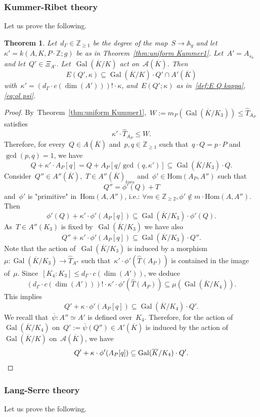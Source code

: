 \documentclass[12pt]{amsart}
\newtheorem{theorem}{Theorem}[section]
\newcommand{\Hom}{\mbox{Hom}}
\newcommand{\Gal}{{\rm Gal}}
\newcommand{\Z}{{\mathbb Z}}
\renewcommand{\Gal}{{\operatorname{Gal}}}
\newcommand{\ol}{\overline}
\newcommand{\wh}{\widehat}
\begin{document}
\subsubsection{Kummer-Ribet theory}
Let us prove the following.
\begin{theorem}\label{thm:Gal En} Let~$d_\Gamma\in\Z_{\geq1}$ be the degree of the map~$S\to \mathbb{A}_g$ and let~$\kappa'=k(A,K,P\cdot \Z;g)$ be as in Theorem~\ref{thm:uniform Kummer1}.
Let~$A'=A_{s_n}$ and let~$Q'\in\Xi_{A'}$. Let~$\Gal(\ol{K}/K)$ act on~$\mathcal{A}(\ol{K})$.
Then
\[
E(Q',\kappa)\subseteq \Gal(\ol{K}/K) \cdot Q'\cap A'(\ol{K})
\]
with~$\kappa'=(d_\Gamma\cdot c(\dim(A')))!\cdot \kappa$, and~$E(Q';\kappa)$ as in~\eqref{def:E Q kappa}, \eqref{eq:ol psi}.
\end{theorem}
\begin{proof}
By~Theorem~\ref{thm:uniform Kummer1},~$W:=m_P(\Gal(\ol{K}/K_3))\leq \wh{T}_{A_P}$ satisfies
\[
\kappa'\cdot\wh{T}_{A_P}\leq  W.
\]
Therefore, for every~$Q\in A(\ol{K})$ and~$p,q\in\Z_{\geq1}$ such that~$q\cdot Q=p\cdot P$ and~$\gcd(p,q)=1$, we have
\[
Q+\kappa'\cdot A_P[q]=Q+A_P[q/\gcd(q,\kappa')]\subseteq \Gal(\ol{K}/K_3)\cdot Q.
\]
Consider~$Q''\in A''(\ol{K})$,~$T\in A''(\ol{K})_{tors}$ and~$\phi'\in \Hom(A_P,A'')$ such that
\[
Q''=\phi'(Q)+T
\]
and~$\phi'$ is "primitive" in~$\Hom(A,A'')$, i.e.:
$
\forall m\in\Z_{\geq2}, \phi'\not\in m\cdot \Hom(A,A'').
$
Then
\[
\phi'(Q)+\kappa'\cdot \phi'(A_P[q])\subseteq \Gal(\ol{K}/K_3)\cdot \phi'(Q).
\]
As~$T\in A''(K_3)$ is fixed by~$\Gal(\ol{K}/K_3)$ we have also
\[
Q''+\kappa'\cdot \phi'(A_P[q])\subseteq \Gal(\ol{K}/K_3)\cdot Q''.
\]
Note that the action of~$\Gal(\ol{K}/K_3)$ is induced by a morphism~$\mu:\Gal(\ol{K}/K_3)\to \wh{T}_{A''}$
such that~$\kappa'\cdot \phi'(\wh{T}(A_P))$ is contained in the image of~$\mu$. Since~$[K_4:K_3]\leq d_\Gamma\cdot c(\dim(A'))$,
we deduce
\[
(d_\Gamma\cdot c(\dim(A')))!\cdot \kappa'\cdot \phi'(\wh{T}(A_P))\subseteq \mu(\Gal(\ol{K}/K_4)).
\]
This implies
\[
Q'+\kappa\cdot \phi'(A_P[q])\subseteq \Gal(\ol{K}/K_4)\cdot Q'.
\]
We recall that~$\ol{\psi}:A''\simeq A'$ is defined over~$K_4$. Therefore, for the action of~$\Gal(\ol{K}/K_4)$ on~$Q':=\ol{\psi}(Q'')\in A'(\ol{K})$ is induced by the action of~$\Gal(\ol{K}/K)$ on~$\mathcal{A}(\ol{K})$, we have
\[
Q'+\kappa\cdot \phi'(A_P[q])\subseteq \Gal(\ol{K}/K_4)\cdot 
Q'.\qedhere
\]
\end{proof}

\subsubsection{Lang-Serre theory} Let us prove the following.
\end{document}
